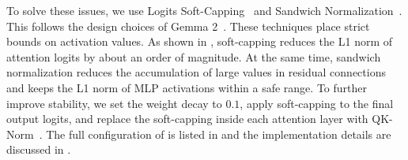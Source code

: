 To solve these issues, we use Logits Soft-Capping~\cite{bello2017softcapping} and Sandwich Normalization~\cite{ding2021cogview}. This follows the design choices of Gemma 2~\cite{morgane2024gemma2}. These techniques place strict bounds on activation values. As shown in , soft-capping reduces the L1 norm of attention logits by about an order of magnitude. At the same time, sandwich normalization reduces the accumulation of large values in residual connections and keeps the L1 norm of MLP activations within a safe range. To further improve stability, we set the weight decay to $0.1$, apply soft-capping to the final output logits, and replace the soft-capping inside each attention layer with QK-Norm~\cite{henry2020qknorm}. The full configuration of \sys is listed in  and the implementation details are discussed in .







